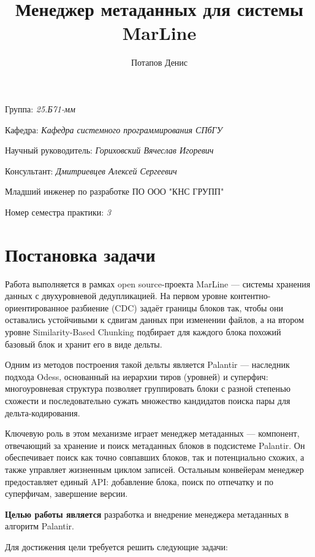 \documentclass[a4paper]{article}
\title{Менеджер метаданных для системы MarLine}
\author{Потапов Денис}
\date{}
\begin{document}
\maketitle

\begin{flushright}
    Группа: \emph{25.Б71-мм}

    Кафедра: \emph{Кафедра системного программирования СПбГУ}

    Научный руководитель: \emph{Гориховский Вячеслав Игоревич}

    Консультант: \emph{Дмитриевцев Алексей Сергеевич}

    Младший инженер по разработке ПО ООО "КНС ГРУПП"

    Номер семестра практики: \emph{3}
\end{flushright}


\section{Постановка задачи}

Работа выполняется в рамках open source-проекта MarLine --- системы хранения
данных с двухуровневой дедупликацией. На первом уровне контентно-ориентированное
разбиение (CDC) задаёт границы блоков так, чтобы они оставались устойчивыми к
сдвигам данных при изменении файлов, а на втором уровне Similarity-Based Chunking
подбирает для каждого блока похожий базовый блок и хранит его в виде дельты.

Одним из методов построения такой дельты является Palantir --- наследник подхода
Odess, основанный на иерархии тиров (уровней) и суперфич: многоуровневая структура
позволяет группировать блоки с разной степенью схожести и последовательно сужать
множество кандидатов поиска пары для дельта-кодирования.

Ключевую роль в этом механизме играет менеджер метаданных --- компонент,
отвечающий за хранение и поиск метаданных блоков в подсистеме Palantir. Он
обеспечивает поиск как точно совпавших блоков, так и потенциально схожих, а также
управляет жизненным циклом записей. Остальным конвейерам менеджер предоставляет
единый API: добавление блока, поиск по отпечатку и по суперфичам, завершение
версии.

\textbf{Целью работы является} разработка и внедрение менеджера метаданных в
алгоритм Palantir.

Для достижения цели требуется решить следующие задачи:
\end{document}
